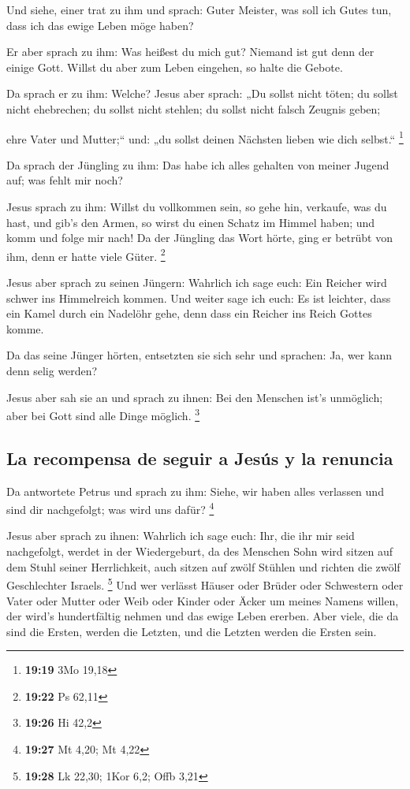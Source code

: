  Und siehe, einer trat zu ihm und sprach: Guter Meister,
was soll ich Gutes tun, dass ich das ewige Leben möge haben?

 Er aber sprach zu ihm: Was heißest du mich gut? Niemand
ist gut denn der einige Gott. Willst du aber zum Leben eingehen, so
halte die Gebote.

 Da sprach er zu ihm: Welche? Jesus aber sprach: „Du
sollst nicht töten; du sollst nicht ehebrechen; du sollst nicht stehlen;
du sollst nicht falsch Zeugnis geben;

 ehre Vater und Mutter;`` und: „du sollst deinen Nächsten
lieben wie dich selbst.`` \footnote{\textbf{19:19} 3Mo 19,18}

 Da sprach der Jüngling zu ihm: Das habe ich alles
gehalten von meiner Jugend auf; was fehlt mir noch?

 Jesus sprach zu ihm: Willst du vollkommen sein, so gehe
hin, verkaufe, was du hast, und gib's den Armen, so wirst du einen
Schatz im Himmel haben; und komm und folge mir nach!  Da
der Jüngling das Wort hörte, ging er betrübt von ihm, denn er hatte
viele Güter. \footnote{\textbf{19:22} Ps 62,11}

 Jesus aber sprach zu seinen Jüngern: Wahrlich ich sage
euch: Ein Reicher wird schwer ins Himmelreich kommen. 
Und weiter sage ich euch: Es ist leichter, dass ein Kamel durch ein
Nadelöhr gehe, denn dass ein Reicher ins Reich Gottes komme.

 Da das seine Jünger hörten, entsetzten sie sich sehr und
sprachen: Ja, wer kann denn selig werden?

 Jesus aber sah sie an und sprach zu ihnen: Bei den
Menschen ist's unmöglich; aber bei Gott sind alle Dinge möglich.
\footnote{\textbf{19:26} Hi 42,2}

\hypertarget{la-recompensa-de-seguir-a-jesuxfas-y-la-renuncia}{%
\subsection{La recompensa de seguir a Jesús y la
renuncia}\label{la-recompensa-de-seguir-a-jesuxfas-y-la-renuncia}}

 Da antwortete Petrus und sprach zu ihm: Siehe, wir haben
alles verlassen und sind dir nachgefolgt; was wird uns dafür?
\footnote{\textbf{19:27} Mt 4,20; Mt 4,22}

 Jesus aber sprach zu ihnen: Wahrlich ich sage euch: Ihr,
die ihr mir seid nachgefolgt, werdet in der Wiedergeburt, da des
Menschen Sohn wird sitzen auf dem Stuhl seiner Herrlichkeit, auch sitzen
auf zwölf Stühlen und richten die zwölf Geschlechter Israels.
\footnote{\textbf{19:28} Lk 22,30; 1Kor 6,2; Offb 3,21} 
Und wer verlässt Häuser oder Brüder oder Schwestern oder Vater oder
Mutter oder Weib oder Kinder oder Äcker um meines Namens willen, der
wird's hundertfältig nehmen und das ewige Leben ererben. 
Aber viele, die da sind die Ersten, werden die Letzten, und die Letzten
werden die Ersten sein.

